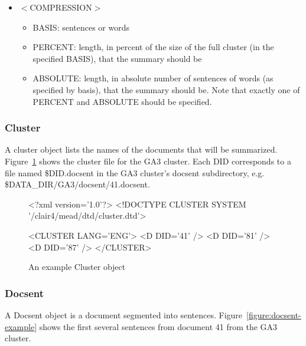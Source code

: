 \documentclass[10pt]{article}
\begin{document}
\begin{itemize}
\item $<$COMPRESSION$>$

\begin{itemize}
\item BASIS: sentences or words
\item PERCENT: length, in percent of the size of the full cluster (in
the specified BASIS), that the summary should be
\item ABSOLUTE: length, in absolute number of sentences of words
(as specified by basis), that the summary should be.  
Note that exactly one of PERCENT
and ABSOLUTE should be specified.
\end{itemize}


\end{itemize}


\subsubsection {Cluster}

A cluster object lists the names of the documents that will be summarized.
Figure~\ref{figure:cluster-example} shows the cluster file for
the GA3 cluster.  Each DID corresponds to a file named
\$DID.docsent in the GA3 cluster's docsent subdirectory, e.g.
\$DATA\_DIR/GA3/docsent/41.docsent.

\begin{figure}[htp!]
\centering
\begin{boxedverbatim}
<?xml version='1.0'?>
<!DOCTYPE CLUSTER SYSTEM '/clair4/mead/dtd/cluster.dtd'>

<CLUSTER LANG='ENG'>
        <D DID='41' />
        <D DID='81' />
        <D DID='87' />
</CLUSTER>
\end{boxedverbatim}
\caption{An example Cluster object}
\label{figure:cluster-example}
\end{figure}


\subsubsection{Docsent}

A Docsent object is a document segmented into sentences.
Figure~\ref{figure:docsent-example} shows the first 
several sentences from document 41 from the GA3 cluster.
\end{document}
